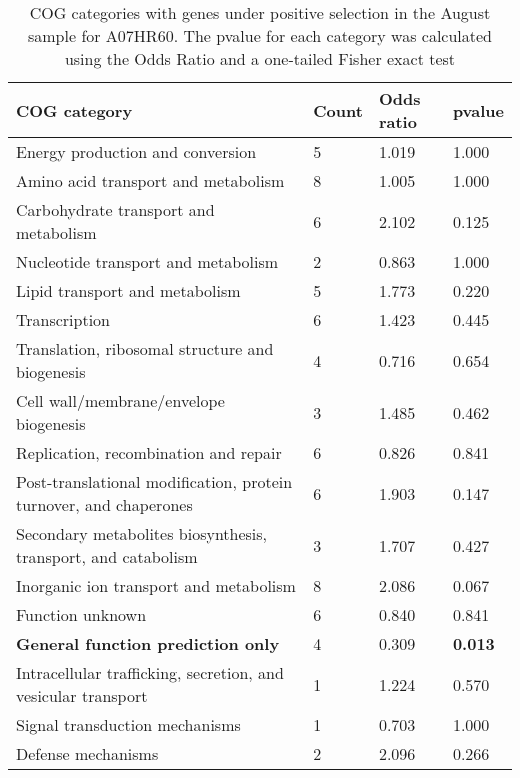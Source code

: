 \begin{table}[hb]
\footnotesize 
	\tabcolsep=0.11cm 
\caption{COG categories with genes under positive selection in the August sample for A07HR60. The pvalue for each category was calculated using the Odds Ratio and a one-tailed Fisher exact test} 
\begin{tabularx}{\textwidth}{L{6cm}R{2cm}R{2cm}R{2cm}} 
\hline 
\textbf{COG category} & \textbf{Count} & \textbf{Odds ratio} & \textbf{pvalue} \\ 
\hline 
Energy production and conversion & 5 & 1.019 & 1.000 \\ 
Amino acid transport and metabolism & 8 & 1.005 & 1.000 \\ 
Carbohydrate transport and metabolism & 6 & 2.102 & 0.125 \\ 
Nucleotide transport and metabolism & 2 & 0.863 & 1.000 \\ 
Lipid transport and metabolism & 5 & 1.773 & 0.220 \\ 
Transcription & 6 & 1.423 & 0.445 \\ 
Translation, ribosomal structure and biogenesis & 4 & 0.716 & 0.654 \\ 
Cell wall/membrane/envelope biogenesis & 3 & 1.485 & 0.462 \\ 
Replication, recombination and repair & 6 & 0.826 & 0.841 \\ 
Post-translational modification, protein turnover, and chaperones & 6 & 1.903 & 0.147 \\ 
Secondary metabolites biosynthesis, transport, and catabolism & 3 & 1.707 & 0.427 \\ 
Inorganic ion transport and metabolism & 8 & 2.086 & 0.067 \\ 
Function unknown & 6 & 0.840 & 0.841 \\ 
\textbf{General function prediction only} & 4 & 0.309 & \textbf{0.013} \\ 
Intracellular trafficking, secretion, and vesicular transport & 1 & 1.224 & 0.570 \\ 
Signal transduction mechanisms & 1 & 0.703 & 1.000 \\ 
Defense mechanisms & 2 & 2.096 & 0.266 \\ 
\end{tabularx} 
\label{August_COG_Selection_A07HR60} 
 \end{table} 

